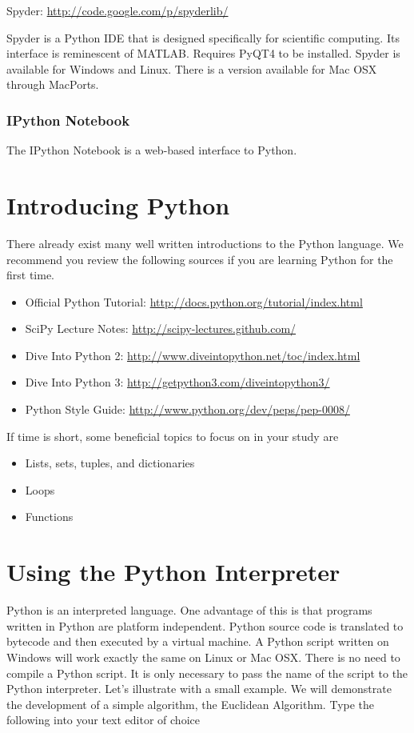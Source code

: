 Spyder: \url{http://code.google.com/p/spyderlib/}

Spyder is a Python IDE that is designed specifically for scientific computing. 
Its interface is reminescent of MATLAB. 
Requires PyQT4 to be installed. 
Spyder is available for Windows and Linux.  
There is a version available for Mac OSX through MacPorts.

\subsubsection*{IPython Notebook}
The IPython Notebook is a web-based interface to Python.

\section*{Introducing Python}
There already exist many well written introductions to the Python language. 
We recommend you review the following sources if you are learning Python for the first time.

\begin{itemize}
\item Official Python Tutorial: \url{http://docs.python.org/tutorial/index.html}
\item SciPy Lecture Notes: \url{http://scipy-lectures.github.com/}
\item Dive Into Python 2: \url{http://www.diveintopython.net/toc/index.html}
\item Dive Into Python 3: \url{http://getpython3.com/diveintopython3/}
\item Python Style Guide: \url{http://www.python.org/dev/peps/pep-0008/}
\end{itemize}

If time is short, some beneficial topics to focus on in your study are
\begin{itemize}
\item Lists, sets, tuples, and dictionaries
\item Loops
\item Functions
\end{itemize}


\section*{Using the Python Interpreter}
Python is an interpreted language.
One advantage of this is that programs written in Python are platform independent. 
Python source code is translated to bytecode and then executed by a virtual machine.
A Python script written on Windows will work exactly the same on Linux or Mac OSX.
There is no need to compile a Python script.
It is only necessary to pass the name of the script to the Python interpreter. 
Let's illustrate with a small example.
We will demonstrate the development of a simple algorithm, the Euclidean Algorithm.
Type the following into your text editor of choice


